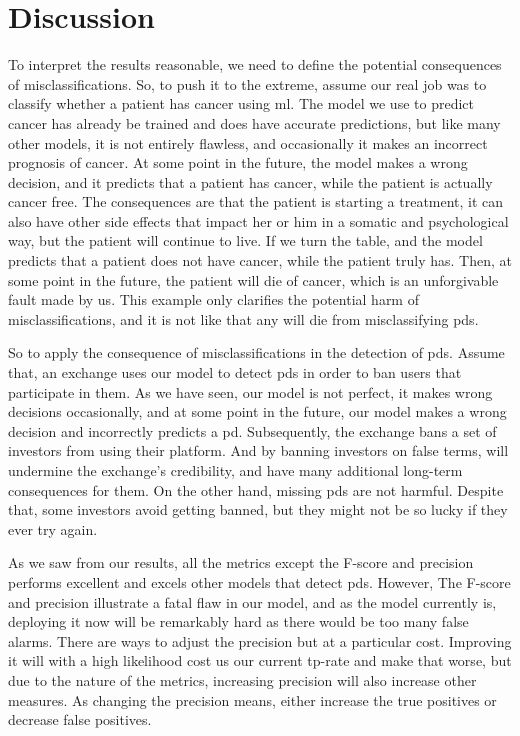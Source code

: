 \section{Discussion}
To interpret the results reasonable, we need to define the potential consequences of misclassifications. So, to push it to the extreme, assume our real job was to classify whether a patient has cancer using \ac{ml}. The model we use to predict cancer has already be trained and does have accurate predictions, but like many other models, it is not entirely flawless, and occasionally it makes an incorrect prognosis of cancer. At some point in the future, the model makes a wrong decision, and it predicts that a patient has cancer, while the patient is actually cancer free. The consequences are that the patient is starting a treatment, it can also have other side effects that impact her or him in a somatic and psychological way, but the patient will continue to live. If we turn the table, and the model predicts that a patient does not have cancer, while the patient truly has. Then, at some point in the future, the patient will die of cancer, which is an unforgivable fault made by us. This example only clarifies the potential harm of misclassifications, and it is not like that any will die from misclassifying \acp{pd}.

So to apply the consequence of misclassifications in the detection of \acp{pd}. Assume that, an exchange uses our model to detect \acp{pd} in order to ban users that participate in them. As we have seen, our model is not perfect, it makes wrong decisions occasionally, and at some point in the future, our model makes a wrong decision and incorrectly predicts a \ac{pd}. Subsequently, the exchange bans a set of investors from using their platform. And by banning investors on false terms, will undermine the exchange's credibility, and have many additional long-term consequences for them. On the other hand, missing \acp{pd} are not harmful. Despite that, some investors avoid getting banned, but they might not be so lucky if they ever try again.

As we saw from our results, all the metrics except the F-score and precision performs excellent and excels other models that detect \acp{pd}. However, The F-score and precision illustrate a fatal flaw in our model, and as the model currently is, deploying it now will be remarkably hard as there would be too many false alarms. There are ways to adjust the precision but at a particular cost. Improving it will with a high likelihood cost us our current tp-rate and make that worse, but due to the nature of the metrics, increasing precision will also increase other measures. As changing the precision means, either increase the true positives or decrease false positives.

